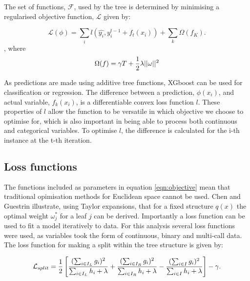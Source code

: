\documentclass[review,12pt,authoryear]{elsarticle}
\begin{document}
\begin{linenumbers}
The set of functions, $\mathcal{F}$, used by the tree is determined by minimising a regularised objective function, $\mathcal{L}$ given by:

\begin{equation}\label{eqn:objective}
 \mathcal{L}(\phi)=\sum_i l(\hat{y_i}, y_i^{t-1} + f_t(x_i)) + \sum_k \Omega (f_K).
\end{equation}, where
\begin{equation}
  \Omega(f) = \gamma T + {{1}\over{2}}\lambda ||\omega||^2
\end{equation}

As predictions are made using additive tree functions, XGboost can be used for classification or regression. The difference between a prediction, $\phi(x_i)$, and actual variable, $f_{k}(x_i)$, is a differentiable convex loss function $l$. These properties of $l$ allow the function to be versatile in which objective we choose to optimise for, which is also important in being able to process both continuous and categorical variables. To optimise $l$, the difference is calculated for the i-th instance at the t-th iteration.
\subsection{Loss functions}

The functions included as parameters in equation \ref{eqn:objective} mean that traditional opimisation methods for Euclidean space cannot be used. Chen and Guestrin \citep{chenXGBoostScalableTree2016} illustrate, using Taylor expansions, that for a fixed structure $q(x)$ the optimal weight $\omega^*_j$ for a leaf $j$ can be derived. Importantly a loss function can be used to fit a model iteratively to data. For this analysis several loss functions were used, as variables took the form of continuous, binary and multi-call data. The loss function for making a split within the tree structure is given by:

\begin{equation} \label{eqn:enumerate}
\mathcal{L}_{split} = {{1}\over{2}} \left[ 
 {{(\sum_{i\in I_L}g_i)^{2}}\over{\sum_{i\in I_L} h_i + \lambda}} +
 {{(\sum_{i\in I_R}g_i)^{2}}\over{\sum_{i\in I_R} h_i + \lambda}} -
 {{(\sum_{i\in I}{g_i})^{2}}\over{\sum_{i \in I} h_i + \lambda}} \right] - \gamma.
\end{equation}


\end{linenumbers}
\end{document}
